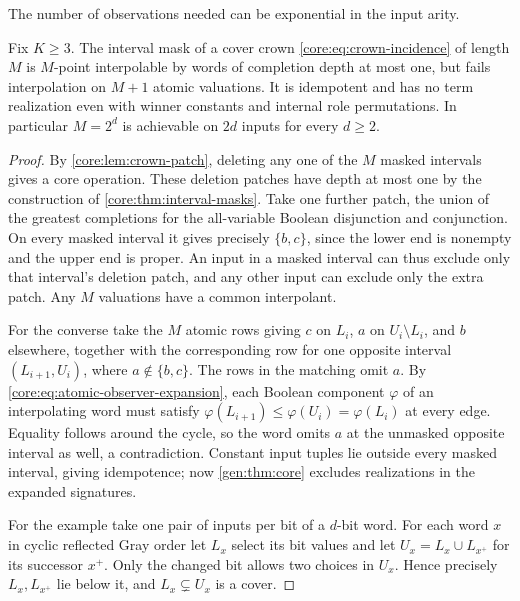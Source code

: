 The number of observations needed can be exponential in the input arity.

\begin{theorem}
\label{core:thm:exponential-locality}
Fix $K\ge3$. The interval mask of a cover crown
\eqref{core:eq:crown-incidence} of length $M$ is $M$-point interpolable
by words of completion depth at most one, but fails interpolation on
$M+1$ atomic valuations. It is idempotent and has no term realization
even with winner constants and internal role permutations.
In particular $M=2^d$ is achievable on $2d$ inputs for every $d\ge2$.
\end{theorem}
\begin{proof}
By \cref{core:lem:crown-patch}, deleting any one of the $M$ masked
intervals gives a core operation. These deletion patches have depth
at most one by the construction of \cref{core:thm:interval-masks}.
Take one further patch, the union of the greatest completions for the
all-variable Boolean disjunction and conjunction. On every masked
interval it gives precisely $\{b,c\}$, since the lower end is
nonempty and the upper end is proper. An input in a masked interval
can thus exclude only that interval's deletion patch, and any other
input can exclude only the extra patch. Any $M$ valuations have a
common interpolant.

For the converse take the $M$ atomic rows giving $c$ on $L_i$, $a$ on
$U_i\setminus L_i$, and $b$ elsewhere, together with the corresponding
row for one opposite interval $(L_{i+1},U_i)$, where $a\notin\{b,c\}$.
The rows in the matching omit $a$. By
\eqref{core:eq:atomic-observer-expansion}, each Boolean component
$\varphi$ of an interpolating word must satisfy
$\varphi(L_{i+1})\le\varphi(U_i)=\varphi(L_i)$ at every edge.
Equality follows around the cycle, so the word omits $a$ at the
unmasked opposite interval as well, a contradiction. Constant input
tuples lie outside every masked interval, giving idempotence; now
\cref{gen:thm:core} excludes realizations in the expanded signatures.

For the example take one pair of inputs per bit of a $d$-bit word.
For each word $x$ in cyclic reflected Gray order let $L_x$ select
its bit values and let $U_x=L_x\cup L_{x^+}$ for its successor $x^+$.
Only the changed bit allows two choices in $U_x$. Hence precisely
$L_x,L_{x^+}$ lie below it, and $L_x\subsetneq U_x$ is a cover.
\end{proof}

